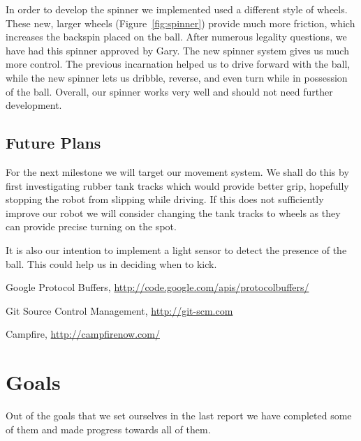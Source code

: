 \documentclass[12pt, a4paper, titlepage]{article}
\begin{document}
In order to develop the spinner we implemented used a different style of wheels.
These new, larger wheels (Figure~\ref{fig:spinner}) provide much more friction,
which increases the backspin placed on the ball. After numerous legality
questions, we have had this spinner approved by Gary. The new spinner system
gives us much more control. The previous incarnation helped us to drive forward
with the ball, while the new spinner lets us dribble, reverse, and even turn
while in possession of the ball. Overall, our spinner works very well and should
not need further development.

\subsection{Future Plans}

For the next milestone we will target our movement system. We shall do this
by first investigating rubber tank tracks which would provide better grip,
hopefully stopping the robot from slipping while driving. If this does not
sufficiently improve our robot we will consider changing the tank tracks to
wheels as they can provide precise turning on the spot.

It is also our intention to implement a light sensor to detect the presence of
the ball. This could help us in deciding when to kick.

\newpage

\setcounter{section}{5}
\begin{thebibliography}{9}

	Google Protocol Buffers,
	\url{http://code.google.com/apis/protocolbuffers/}

	Git Source Control Management,
	\url{http://git-scm.com}

	Campfire,
	\url{http://campfirenow.com/}

\end{thebibliography}

\appendix

\section{Goals}

Out of the goals that we set ourselves in the last report we have completed some
of them and made progress towards all of them.\\
\end{document}
